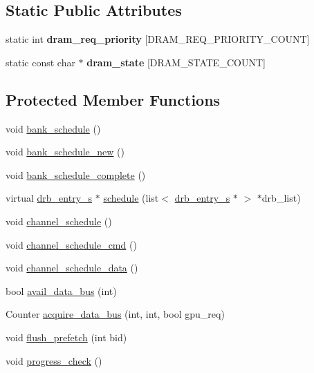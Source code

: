 \subsection*{Static Public Attributes}
\begin{DoxyCompactItemize}
\item 
static int {\bfseries dram\_\-req\_\-priority} \mbox{[}DRAM\_\-REQ\_\-PRIORITY\_\-COUNT\mbox{]}
\item 
static const char $\ast$ {\bfseries dram\_\-state} \mbox{[}DRAM\_\-STATE\_\-COUNT\mbox{]}
\end{DoxyCompactItemize}
\subsection*{Protected Member Functions}
\begin{DoxyCompactItemize}
\item 
void \hyperlink{classdram__controller__c_aa867d0ef9025402fd101fa6805b7eabc}{bank\_\-schedule} ()
\item 
void \hyperlink{classdram__controller__c_ac756549d7ec5f7fa43da299ed202a765}{bank\_\-schedule\_\-new} ()
\item 
void \hyperlink{classdram__controller__c_a841f14d3e9210fe4cf61c8f2af3c8a6e}{bank\_\-schedule\_\-complete} ()
\item 
virtual \hyperlink{structdrb__entry__s}{drb\_\-entry\_\-s} $\ast$ \hyperlink{classdram__controller__c_a0ce04de6742977e7c962ef977c1b9da0}{schedule} (list$<$ \hyperlink{structdrb__entry__s}{drb\_\-entry\_\-s} $\ast$ $>$ $\ast$drb\_\-list)
\item 
void \hyperlink{classdram__controller__c_a4bb5af511ad009ac4e74ce07e4df745f}{channel\_\-schedule} ()
\item 
void \hyperlink{classdram__controller__c_aed40936dd5ade7769eb84a8624dc06a8}{channel\_\-schedule\_\-cmd} ()
\item 
void \hyperlink{classdram__controller__c_aa33f2630c24db2bec43bccd6c8a5e3cc}{channel\_\-schedule\_\-data} ()
\item 
bool \hyperlink{classdram__controller__c_adee305e1751db04ee9db1ffd30caa6a5}{avail\_\-data\_\-bus} (int)
\item 
Counter \hyperlink{classdram__controller__c_a064fedf84d64d7addfeed1ac14c5b749}{acquire\_\-data\_\-bus} (int, int, bool gpu\_\-req)
\item 
void \hyperlink{classdram__controller__c_a97f17a711a47b54cc912c11192978d85}{flush\_\-prefetch} (int bid)
\item 
void \hyperlink{classdram__controller__c_a64503f53340c0f14ab7f5bc64d55777d}{progress\_\-check} ()

\end{DoxyCompactItemize}
